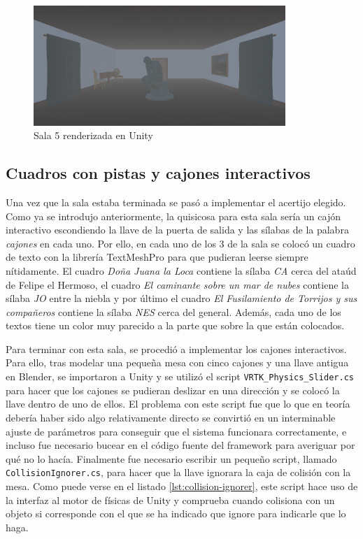 \begin{figure}[!h]
\begin{center}
\includegraphics[width=0.85\textwidth]{imagenes/7/salas-unity/unity-sala-5.png}
\caption{Sala 5 renderizada en Unity}
\label{fig:unity-sala-5}
\end{center}
\end{figure}

\subsection{Cuadros con pistas y cajones interactivos}

Una vez que la sala estaba terminada se pasó a implementar el acertijo elegido. Como ya se introdujo anteriormente, la quisicosa para esta sala sería un cajón interactivo escondiendo la llave de la puerta de salida y las sílabas de la palabra \textit{cajones} en cada uno. Por ello, en cada uno de los 3 de la sala se colocó un cuadro de texto con la librería TextMeshPro para que pudieran leerse siempre nítidamente. El cuadro \textit{Doña Juana la Loca} contiene la sílaba \textit{CA} cerca del ataúd de Felipe el Hermoso, el cuadro \textit{El caminante sobre un mar de nubes} contiene la sílaba \textit{JO} entre la niebla y por último el cuadro \textit{El Fusilamiento de Torrijos y sus compañeros} contiene la sílaba \textit{NES} cerca del general. Además, cada uno de los textos tiene un color muy parecido a la parte que sobre la que están colocados.

Para terminar con esta sala, se procedió a implementar los cajones interactivos. Para ello, tras modelar una pequeña mesa con cinco cajones y una llave antigua en Blender, se importaron a Unity y se utilizó el script \texttt{VRTK\_Physics\_Slider.cs} para hacer que los cajones se pudieran deslizar en una dirección y se colocó la llave dentro de uno de ellos. El problema con este script fue que lo que en teoría debería haber sido algo relativamente directo se convirtió en un interminable ajuste de parámetros para conseguir que el sistema funcionara correctamente, e incluso fue necesario bucear en el código fuente del framework para averiguar por qué no lo hacía. Finalmente fue necesario escribir un pequeño script, llamado \texttt{CollisionIgnorer.cs}, para hacer que la llave ignorara la caja de colisión con la mesa. Como puede verse en el listado \ref{lst:collision-ignorer}, este script hace uso de la interfaz al motor de físicas de Unity y comprueba cuando colisiona con un objeto si corresponde con el que se ha indicado que ignore para indicarle que lo haga.

